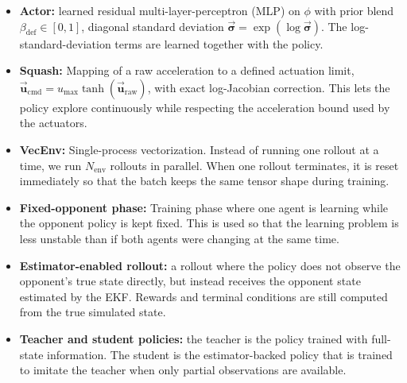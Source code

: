 \begin{itemize}
\item \textbf{Actor:} learned residual multi-layer-perceptron (MLP) on \(\phi\) with prior blend \(\beta_{\mathrm{def}}\in[0,1]\), diagonal standard deviation \(\vec{\boldsymbol{\sigma}}=\exp(\log\vec{\boldsymbol{\sigma}})\).  The log-standard-deviation terms are learned together with the policy.
\item \textbf{Squash:} Mapping of a raw  acceleration to a defined actuation limit, \(\vec{\mathbf{u}}_{\mathrm{cmd}} = u_{\max}\tanh(\vec{\mathbf{u}}_{\mathrm{raw}})\), with exact log-Jacobian correction. This lets the policy explore continuously while respecting the acceleration bound used by the actuators.
\item \textbf{VecEnv:} Single-process vectorization. Instead of running one rollout at a time, we run \(N_{\mathrm{env}}\) rollouts in parallel. When one rollout terminates, it is reset immediately so that the batch keeps the same tensor shape during training.

\item \textbf{Fixed-opponent phase:} Training phase where one agent is learning while the opponent policy is kept fixed. This is used so that the learning problem is less unstable than if both agents were changing at the same time.

\item \textbf{Estimator-enabled rollout:} a rollout where the policy does not observe the opponent's true state directly, but instead receives the opponent state estimated by the EKF. Rewards and terminal conditions are still computed from the true simulated state.

\item \textbf{Teacher and student policies:} the teacher is the policy trained with full-state information. The student is the estimator-backed policy that is trained to imitate the teacher when only partial observations are available.
\end{itemize}